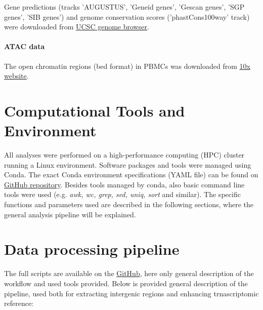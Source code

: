 Gene predictions (tracks 'AUGUSTUS', 'Geneid genes', 'Gescan genes', 'SGP genes', 'SIB genes') and 
genome conservation scores ('phastCons100way' track) were downloaded from \href{https://genome.ucsc.edu/}{UCSC genome browser}.

\paragraph{ATAC data}

The open chromatin regions (bed format) in PBMCs was downloaded from \href{https://www.10xgenomics.com/datasets/10k-human-pbmcs-atac-v2-chromium-controller-2-standard}{10x website}.

\section{Computational Tools and Environment}

All analyses were performed on a high-performance computing (HPC) cluster running a Linux environment.
Software packages and tools were managed using Conda.
The exact Conda environment specifications (YAML file) can be found on \href{https://github.com/JuozapasI/MasterThesis/}{GitHub repository}.
Besides tools managed by conda, also basic command line tools were used (e.g. \textit{awk, wc, grep, sed, uniq, sort} and similar).
The specific functions and parameters used are described in the following sections, where the general analysis pipeline will be explained.

\section{Data processing pipeline}

The full scripts are available on the \href{https://github.com/JuozapasI/MasterThesis/}{GitHub}, here only general description of the workflow and used tools provided.
Below is provided general description of the pipeline, used both for extracting intergenic regions and enhancing trnascriptomic reference:

